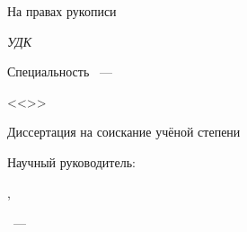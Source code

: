 \thispagestyle{empty}

\begin{center}
\thesisOrganization \par
\par
\end{center}

\vspace{10mm}
\begin{flushright}
На правах рукописи

{\sl УДК \thesisUdk}
\end{flushright}

\vspace{10mm}
\begin{center}
{\large \thesisAuthor}
\end{center}

\vspace{5mm}
\begin{center}
{\bf \large \thesisTitle
\par}

\vspace{10mm}
{%
Специальность \thesisSpecialtyNumber~---

<<\thesisSpecialtyTitle>>
}

\vspace{10mm}
Диссертация на соискание учёной степени

\thesisDegree
\end{center}

\vspace{10mm}
\begin{flushright}
Научный руководитель:

\supervisorRegalia,\\
\supervisorRegaliaSecond

\supervisorFio

\end{flushright}

\vspace{20mm}
\begin{center}
{\thesisCity~--- \thesisYear}
\end{center}

\newpage
